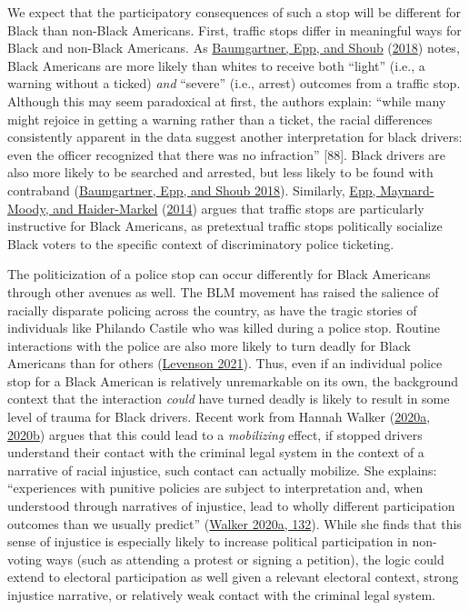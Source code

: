 \documentclass[
  12pt,
]{article}
\begin{document}
We expect that the participatory consequences of such a stop will be different for Black than non-Black Americans. First, traffic stops differ in meaningful ways for Black and non-Black Americans. As \protect\hyperlink{ref-Baumgartner2018}{Baumgartner, Epp, and Shoub} (\protect\hyperlink{ref-Baumgartner2018}{2018}) notes, Black Americans are more likely than whites to receive both ``light'' (i.e., a warning without a ticked) \emph{and} ``severe'' (i.e., arrest) outcomes from a traffic stop. Although this may seem paradoxical at first, the authors explain: ``while many might rejoice in getting a warning rather than a ticket, the racial differences consistently apparent in the data suggest another interpretation for black drivers: even the officer recognized that there was no infraction'' {[}88{]}. Black drivers are also more likely to be searched and arrested, but less likely to be found with contraband (\protect\hyperlink{ref-Baumgartner2018}{Baumgartner, Epp, and Shoub 2018}). Similarly, \protect\hyperlink{ref-Epp2014}{Epp, Maynard-Moody, and Haider-Markel} (\protect\hyperlink{ref-Epp2014}{2014}) argues that traffic stops are particularly instructive for Black Americans, as pretextual traffic stops politically socialize Black voters to the specific context of discriminatory police ticketing.

The politicization of a police stop can occur differently for Black Americans through other avenues as well. The BLM movement has raised the salience of racially disparate policing across the country, as have the tragic stories of individuals like Philando Castile who was killed during a police stop. Routine interactions with the police are also more likely to turn deadly for Black Americans than for others (\protect\hyperlink{ref-Levenson2021}{Levenson 2021}). Thus, even if an individual police stop for a Black American is relatively unremarkable on its own, the background context that the interaction \emph{could} have turned deadly is likely to result in some level of trauma for Black drivers. Recent work from Hannah Walker (\protect\hyperlink{ref-Walker2020}{2020a}, \protect\hyperlink{ref-Walker2020a}{2020b}) argues that this could lead to a \emph{mobilizing} effect, if stopped drivers understand their contact with the criminal legal system in the context of a narrative of racial injustice, such contact can actually mobilize. She explains: ``experiences with punitive policies are subject to interpretation and, when understood through narratives of injustice, lead to wholly different participation outcomes than we usually predict'' (\protect\hyperlink{ref-Walker2020}{Walker 2020a, 132}). While she finds that this sense of injustice is especially likely to increase political participation in non-voting ways (such as attending a protest or signing a petition), the logic could extend to electoral participation as well given a relevant electoral context, strong injustice narrative, or relatively weak contact with the criminal legal system.
\end{document}
